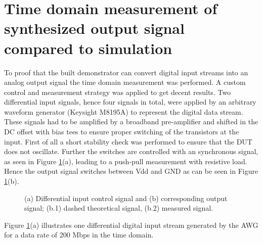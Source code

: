 \documentclass[journal]{IEEEtran}
\begin{document}
\section{Time domain measurement of synthesized output signal compared to simulation}
\label{sec:experiment}

To proof that the built demonstrator can convert digital input streams into an analog output signal the time domain measurement was performed.
A custom control and measurement strategy was applied to get decent results.
Two differential input signals, hence four signals in total, were applied by an arbitrary waveform generator (Keysight M8195A) to represent the digital data stream. 
These signals had to be amplified by a broadband pre-amplifier and shifted in the DC offset with bias tees to ensure proper switching of the transistors at the input.
%
First of all a short stability check was performed to ensure that the DUT does not oscillate.
Further the switches are controlled with an synchronous signal, as seen in Figure \ref{fig:meas_Input_Output_RLoad_100M_SmallSize_Paper}(a), leading to a push-pull measurement with resistive load.
Hence the output signal switches between Vdd and GND as can be seen in Figure \ref{fig:meas_Input_Output_RLoad_100M_SmallSize_Paper}(b).
%
\begin{figure}[htb]
  \centering
	\begin{scriptsize}
  	\def\svgwidth{\columnwidth}
 	 
  	\caption{(a) Differential input control signal and (b) corresponding output signal; (b.1) dashed theoretical signal, (b.2) measured signal.}
  	\label{fig:meas_Input_Output_RLoad_100M_SmallSize_Paper}
	\end{scriptsize}
\end{figure}
%
Figure \ref{fig:meas_Input_Output_RLoad_100M_SmallSize_Paper}(a) illustrates one differential digital input stream generated by the AWG for a data rate of 200 Mbps in the time domain.
\end{document}
